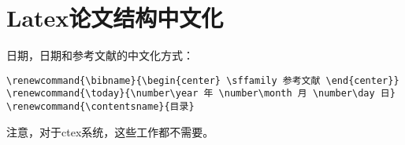 \section{Latex论文结构中文化}
日期，日期和参考文献的中文化方式：
\begin{verbatim}
\renewcommand{\bibname}{\begin{center} \sffamily 参考文献 \end{center}}
\renewcommand{\today}{\number\year 年 \number\month 月 \number\day 日}
\renewcommand{\contentsname}{目录}
\end{verbatim}

注意，对于ctex系统，这些工作都不需要。

